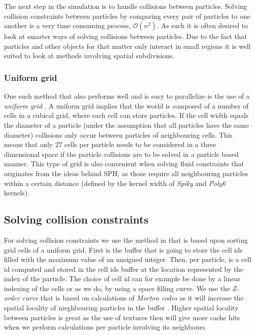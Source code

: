 The next step in the simulation is to handle collisions between particles.
Solving collision constraints between particles by comparing every pair of
particles to one another is a very time consuming process,
$\mathcal{O}(n^{2})$. As such it is often desired to look at smarter ways of
solving collisions between particles. Due to the fact that particles and other
objects for that matter only interact in small regions it is well suited to
look at methods involving spatial subdivisions.

\subsubsection{Uniform grid}

One such method that also performs well and is easy to parallelize is the use
of a \textit{uniform grid} \cite{Green}. A uniform grid implies that the world
is composed of a number of cells in a cubical grid, where each cell can store
particles. If the cell width equals the diameter of a particle (under the
assumption that all particles have the same diameter) collisions only occur
between particles of neighbouring cells. This means that only 27 cells per
particle needs to be considered in a three dimensional space if the particle
collisions are to be solved in a particle based manner. This type of grid is
also convenient when solving fluid constraints that originates from the ideas
behind SPH, as those require all neighbouring particles within a certain
distance (defined by the kernel width of \textit{Spiky} and \textit{Poly6}
kernels).

\subsection{Solving collision constraints}

For solving collision constraints we use the method in
\cite{Green} that is based upon sorting grid cells of a uniform grid. First is
the buffer that is going to store the cell ids filled with the maximum value of
an unsigned integer.  Then, per particle, is a cell id computed and stored in
the cell ids buffer at the location represented by the index of the particle.
The choice of cell id can for example be done by a linear indexing of the cells
or as we do, by using a space filling curve. We use the \textit{Z-order curve}
that is based on calculations of \textit{Morton codes} as it will increase the
spatial locality of nieghbouring particles in the buffer \cite{Green}. Higher
spatial locality between particles is great as the use of textures then will
give more cache hits when we perform calculations per particle involving its
neighbours.

